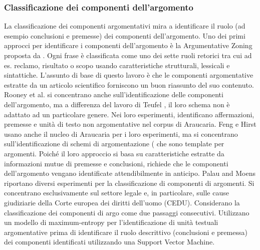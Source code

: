 \subsubsection{Classificazione dei componenti dell'argomento}
La classificazione dei componenti argomentativi mira a identificare il ruolo (ad esempio conclusioni e premesse) dei componenti dell'argomento. Uno dei primi approcci per identificare i componenti dell'argomento è la Argumentative Zoning proposta da \cite{teufel1999}. Ogni frase è classificata come uno dei sette ruoli retorici tra cui ad es. reclamo, risultato o scopo usando caratteristiche strutturali, lessicali e sintattiche. L'assunto di base di questo lavoro è che le componenti argomentative estratte da un articolo scientifico forniscono un buon riassunto del suo contenuto. Rooney et al. \cite{rooney2012applying} si concentrano anche sull'identificazione delle componenti dell'argomento, ma a differenza del lavoro di Teufel \cite{teufel1999}, il loro schema non è adattato ad un particolare genere. Nei loro esperimenti, identificano affermazioni, premesse e unità di testo non argomentative nel corpus di Araucaria. Feng e Hirst \cite{feng2011classifying} usano anche il nucleo di Araucaria per i loro esperimenti, ma si concentrano sull'identificazione di schemi di argomentazione (\cite{walton2002argumentation} che sono template per argomenti. Poiché il loro approccio si basa su caratteristiche estratte da informazioni mutue di premesse e conclusioni, richiede che le componenti dell'argomento vengano identificate attendibilmente in anticipo. 
Palau and Moens \cite{palau2009argumentation} riportano diversi esperimenti per la classificazione di componenti di argomenti. Si concentrano esclusivamente sul settore legale e, in particolare, sulle cause giudiziarie della Corte europea dei diritti dell'uomo (CEDU). Considerano la classificazione dei componenti di argo come due passaggi consecutivi. Utilizzano un modello di maximum-entropy per l'identificazione di unità testuali argomentative prima di identificare il ruolo descrittivo (conclusioni e premessa) dei componenti identificati utilizzando una Support Vector Machine. 

